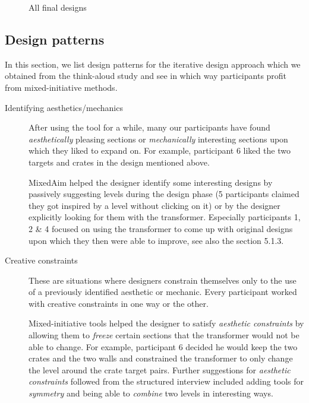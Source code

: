 \begin{figure}[!htbp]
\begin{minipage}[t]{0.2\textwidth}
\end{minipage}

\caption{All final designs}
\end{figure}


\subsection{Design patterns}

In this section, we list design patterns for the iterative design approach which we obtained from the think-aloud study and see in which way participants profit from mixed-initiative methods.

\newpage
\begin{description}
\item[Identifying aesthetics/mechanics] After using the tool for a while, many our participants have found \textit{aesthetically} pleasing sections or \textit{mechanically} interesting sections upon which they liked to expand on. For example, participant 6 liked the two targets and crates in the design mentioned above.



MixedAim helped the designer identify some interesting designs by passively suggesting levels during the design phase (5 participants claimed they got inspired by a level without clicking on it) or by the designer explicitly looking for them with the transformer. Especially participants 1, 2 \& 4 focused on using the transformer to come up with original designs upon which they then were able to improve, see also the section 5.1.3. 

\item[Creative constraints] These are situations where designers constrain themselves only to the use of a previously identified aesthetic or mechanic. Every participant worked with creative constraints in one way or the other.

Mixed-initiative tools helped the designer to satisfy \textit{aesthetic constraints} by allowing them to \textit{freeze} certain sections that the transformer would not be able to change. For example, participant 6 decided he would keep the two crates and the two walls and constrained the transformer to only change the level around the crate target pairs. Further suggestions for \textit{aesthetic constraints} followed from the structured interview included adding tools for \textit{symmetry} and being able to \textit{combine} two levels in interesting ways.


\end{description}
